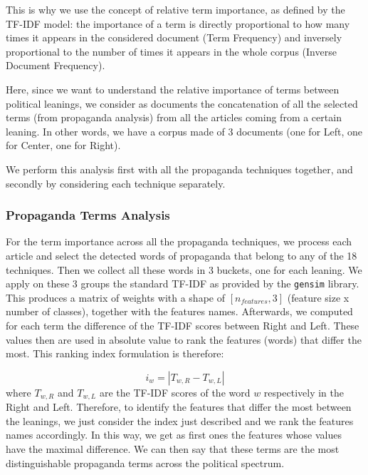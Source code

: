 This is why we use the concept of relative term importance, %
as defined by the TF-IDF model: the importance of a term is directly proportional to how many times it appears in the considered document (Term Frequency) and inversely proportional to the number of times it appears in the whole corpus (Inverse Document Frequency).

Here, since we want to understand the relative importance of terms between political leanings, we consider as documents the concatenation of all the selected terms (from propaganda analysis) from all the articles coming from a certain leaning. In other words, we have a corpus made of 3 documents (one for Left, one for Center, one for Right).

We perform this analysis first with all the propaganda techniques together, and secondly by considering each technique separately.

\subsubsection{Propaganda Terms Analysis}
For the term importance across all the propaganda techniques, we process each article and select the detected words of propaganda that belong to any of the 18 techniques. Then we collect all these words in 3 buckets, one for each leaning.
We apply on these 3 groups the standard TF-IDF as provided by the \texttt{gensim} library. %
This produces a matrix of weights with a shape of $[n_{features}, 3]$ (feature size x number of classes), together with the features names.
Afterwards, we 
computed for each term the difference of the TF-IDF scores between Right and Left.
These values then are used in absolute value to rank the features (words) that differ the most.
This ranking index formulation is therefore:

$$ i_w = | T_{w,R} - T_{w,L} | $$
where $T_{w,R}$ and $T_{w,L}$ are the TF-IDF scores of the word $w$ respectively in the Right and Left.
Therefore, to identify the features that differ the most between the leanings, we just consider the index just described and we rank the features names accordingly.
In this way, we get as first ones the features whose values have the maximal difference.
We can then say that these terms are the most distinguishable propaganda terms across the political spectrum.

